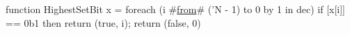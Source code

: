 function HighestSetBit x = {
  foreach (i #\hyperref[zfrom]{from}# ('N - 1) to 0 by 1 in dec)
    if [x[i]] == 0b1 then return (true, i);
  return (false, 0)
}
